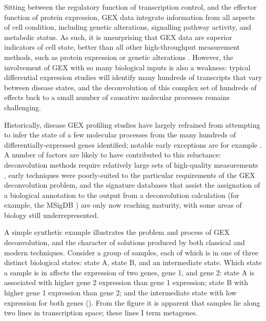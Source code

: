 \documentclass[dissertation.tex]{subfiles}
\begin{document}
Sitting between the regulatory function of transcription control, and the effector function of protein expression, \gls{GEX} data integrate information from all aspects of cell condition, including genetic alterations, signalling pathway activity, and metabolic status.  As such, it is unsurprising that \gls{GEX} data are superior indicators of cell state, better than all other high-throughput measurement methods, such as protein expression or genetic alterations \cite{Ray2014}.  However, the involvement of \gls{GEX} with so many biological inputs is also a weakness: typical differential expression studies will identify many hundreds of transcripts that vary between disease states, and the deconvolution of this complex set of hundreds of effects back to a small number of causative molecular processes remains challenging.

Historically, disease \gls{GEX} profiling studies have largely refrained from attempting to infer the state of a few molecular processes from the many hundreds of differentially-expressed genes identified; notable early exceptions are for example \cite{Alter2000,Lee2003}.  A number of factors are likely to have contributed to this reluctance: deconvolution methods require relatively large sets of high-quality measurements \cite{MacCallum1999}, early techniques were poorly-suited to the particular requirements of the \gls{GEX} deconvolution problem, and the signature databases that assist the assignation of a biological annotation to the output from a deconvolution calculation (for example, the \acrshort{MSigDB} \cite{Subramanian2005}) are only now reaching maturity, with some areas of biology still underrepresented.

A simple synthetic example illustrates the problem and process of \gls{GEX} deconvolution, and the character of solutions produced by both classical and modern techniques.  Consider a group of samples, each of which is in one of three distinct biological states: state A, state B, and an intermediate state.  Which state a sample is in affects the expression of two genes, gene 1, and gene 2: state A is associated with higher gene 2 expression than gene 1 expression; state B with higher gene 1 expression than gene 2; and the intermediate state with low expression for both genes ().  From the figure it is apparent that samples lie along two lines in transcription space; these lines I term metagenes.
\end{document}
